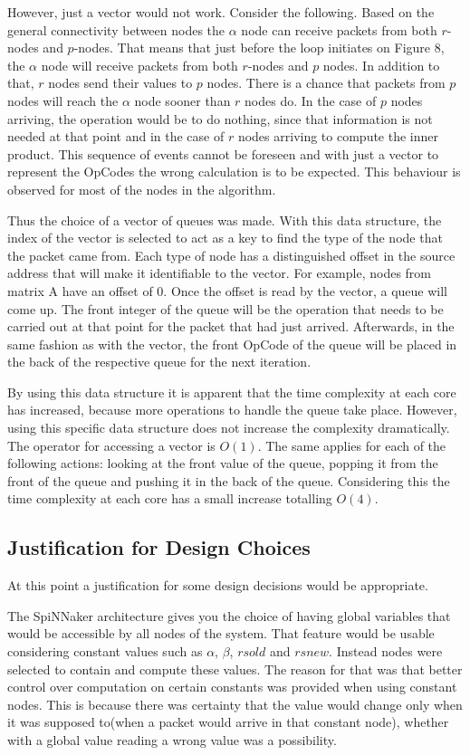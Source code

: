 \documentclass[12pt,twosided]{article}
\begin{document}
However, just a vector would not work. Consider the following. Based on the general connectivity between nodes the $\alpha$ node can receive packets from both $r$-nodes and $p$-nodes. That means that just before the loop initiates on Figure 8, the $\alpha$ node will receive packets from both $r$-nodes and $p$ nodes. In addition to that, $r$ nodes send their values to $p$ nodes. There is a chance that packets from $p$ nodes will reach the $\alpha$ node sooner than $r$ nodes do. In the case of $p$ nodes arriving, the operation would be to do nothing, since that information is not needed at that point and in the case of $r$ nodes arriving to compute the inner product.  This sequence of events cannot be foreseen and with just a vector to represent the OpCodes the wrong calculation is to be expected. This behaviour is observed for most of the nodes in the algorithm.

Thus the choice of a vector of queues was made. With this data structure, the index of the vector is selected to act as a key to find the type of the node that the packet came from. Each type of node has a distinguished offset in the source address that will make it identifiable to the vector. For example, nodes from matrix A have an offset of 0. Once the offset is read by the vector, a queue will come up. The front integer of the queue will be the operation that needs to be carried out at that point for the packet that had just arrived. Afterwards, in the same fashion as with the vector, the front OpCode of the queue will be placed in the back of the respective queue for the next iteration.

By using this data structure it is apparent that the time complexity at each core has increased, because more operations to handle the queue take place. However, using this specific data structure does not increase the complexity dramatically. The operator for accessing a vector is $O(1)$. The same applies for each of the following actions: looking at the front value of the queue, popping it from the front of the queue and pushing it in the back of the queue. Considering this the time complexity at each core has a small increase totalling $O(4)$.
\subsection{Justification for Design Choices}
At this point a justification for some design decisions would be appropriate. 

The SpiNNaker architecture gives you the choice of having global variables that would be accessible by all nodes of the system. That feature would be usable considering constant values such as $\alpha$, $\beta$, $rsold$ and $rsnew$. Instead nodes were selected to contain and compute these values. The reason for that was that better control over computation on certain constants was provided when using constant nodes. This is because there was certainty that the value would change only when it was supposed to(when a packet would arrive in that constant node), whether with a global value reading a wrong value was a possibility.
\end{document}

